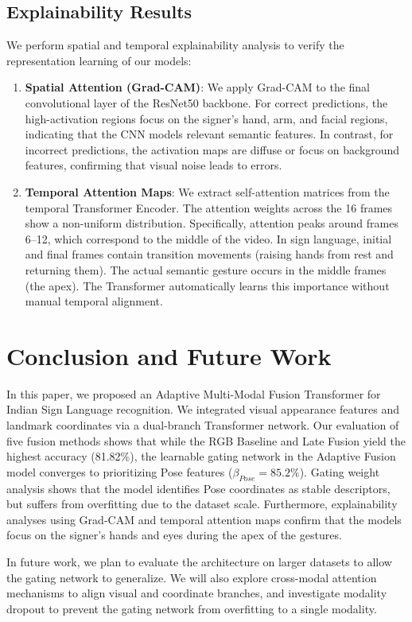 \documentclass[conference]{IEEEtran}
\begin{document}
\begin{table}[t]
\subsection{Explainability Results}
We perform spatial and temporal explainability analysis to verify the representation learning of our models:
\begin{enumerate}
    \item \textbf{Spatial Attention (Grad-CAM)}: We apply Grad-CAM to the final convolutional layer of the ResNet50 backbone. For correct predictions, the high-activation regions focus on the signer's hand, arm, and facial regions, indicating that the CNN models relevant semantic features. In contrast, for incorrect predictions, the activation maps are diffuse or focus on background features, confirming that visual noise leads to errors.
    \item \textbf{Temporal Attention Maps}: We extract self-attention matrices from the temporal Transformer Encoder. The attention weights across the 16 frames show a non-uniform distribution. Specifically, attention peaks around frames 6--12, which correspond to the middle of the video. In sign language, initial and final frames contain transition movements (raising hands from rest and returning them). The actual semantic gesture occurs in the middle frames (the apex). The Transformer automatically learns this importance without manual temporal alignment.
\end{enumerate}

\section{Conclusion and Future Work}
In this paper, we proposed an Adaptive Multi-Modal Fusion Transformer for Indian Sign Language recognition. We integrated visual appearance features and landmark coordinates via a dual-branch Transformer network. Our evaluation of five fusion methods shows that while the RGB Baseline and Late Fusion yield the highest accuracy (81.82\%), the learnable gating network in the Adaptive Fusion model converges to prioritizing Pose features ($\beta_{Pose} = 85.2\%$). Gating weight analysis shows that the model identifies Pose coordinates as stable descriptors, but suffers from overfitting due to the dataset scale. Furthermore, explainability analyses using Grad-CAM and temporal attention maps confirm that the models focus on the signer's hands and eyes during the apex of the gestures.

In future work, we plan to evaluate the architecture on larger datasets to allow the gating network to generalize. We will also explore cross-modal attention mechanisms to align visual and coordinate branches, and investigate modality dropout to prevent the gating network from overfitting to a single modality.


\end{table}
\end{document}
